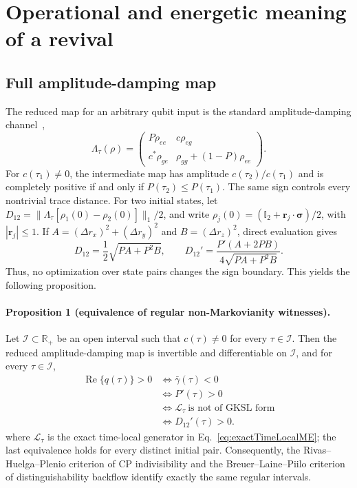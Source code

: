 \documentclass[reprint,superscriptaddress,floatfix,amsmath,amssymb,prresearch,aps]{revtex4-2}
\newcommand{\Ree}{\operatorname{Re}}
\begin{document}
\section{Operational and energetic meaning of a revival}
\label{sec:operational}

\subsection{Full amplitude-damping map}

The reduced map for an arbitrary qubit input is the standard
amplitude-damping channel~\cite{BreuerPetruccione2002},
\begin{equation}
\Lambda_\tau(\rho)=
\begin{pmatrix}
P\rho_{ee}&c\rho_{eg}\\
c^*\rho_{ge}&\rho_{gg}+(1-P)\rho_{ee}
\end{pmatrix}.
\label{eq:ADmap}
\end{equation}
For \(c(\tau_1)\neq0\), the intermediate map has amplitude
\(c(\tau_2)/c(\tau_1)\) and is completely positive if and only if
\(P(\tau_2)\leq P(\tau_1)\). The same sign controls every nontrivial trace
distance. For two initial states, let
\(D_{12}=\|\Lambda_\tau[\rho_1(0)-\rho_2(0)]\|_1/2\), and write
\(\rho_j(0)=(\mathbb I_2+\bm r_j\cdot\bm\sigma)/2\), with
\(|\bm r_j|\leq1\). If
\(A=(\Delta r_x)^2+(\Delta r_y)^2\) and
\(B=(\Delta r_z)^2\), direct evaluation gives
\begin{equation}
D_{12}=\frac12\sqrt{PA+P^2B},
\qquad
D_{12}'=\frac{P'(A+2PB)}{4\sqrt{PA+P^2B}}.
\label{eq:tracedistance}
\end{equation}
Thus, no optimization over state pairs changes the sign boundary. This yields
the following proposition.

\paragraph{Proposition 1 (equivalence of regular non-Markovianity witnesses).}
Let \(\mathcal I\subset\mathbb R_+\) be an open interval such that
\(c(\tau)\neq0\) for every \(\tau\in\mathcal I\). Then the reduced
amplitude-damping map is invertible and differentiable on \(\mathcal I\), and
for every \(\tau\in\mathcal I\),
\begin{equation}
\begin{aligned}
\Ree\{q(\tau)\}>0
&\Longleftrightarrow \bar\gamma(\tau)<0\\
&\Longleftrightarrow P'(\tau)>0\\
&\Longleftrightarrow
\mathcal L_\tau\ \text{is not of GKSL form}\\
&\Longleftrightarrow D_{12}'(\tau)>0 .
\end{aligned}
\label{eq:operationalequivalence}
\end{equation}
where \(\mathcal L_\tau\) is the exact time-local generator in
Eq.~\eqref{eq:exactTimeLocalME}; the last equivalence holds for every distinct
initial pair. Consequently, the Rivas--Huelga--Plenio criterion of CP
indivisibility and the Breuer--Laine--Piilo criterion of distinguishability
backflow identify exactly the same regular intervals.
\end{document}
